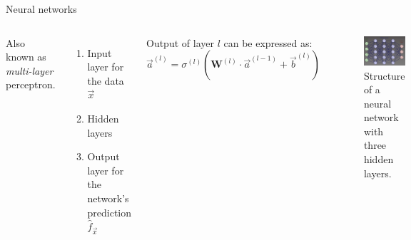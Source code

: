 \begin{frame}{Neural networks}
    \begin{columns}
        \column{\moit} Also known as \emph{multi-layer} perceptron. 
                    \begin{enumerate}
                        \item Input layer for the data $\Vec{x}$
                        \item Hidden layers
                        \item Output layer for the network's prediction $\hat{f}_{\Vec{x}}$
                    \end{enumerate}{}
                     Output of layer $l$ can be expressed as:
                        \begin{equation*}
                            \label{eq:output-any-layer}
                            \Vec{a}^{(l)} = \sigma^{(l)}\left(\mathbf{W}^{(l)} \cdot \Vec{a}^{(l-1)} + \Vec{b}^{(l)}\right)
                        \end{equation*}
        \column{\moit} \begin{figure}[ht]
                            \centering
                            \includegraphics[width=\textwidth]{imgs/Architecture-perceptron-multi-couches-2.png}
                            \caption{Structure of a neural network with three hidden layers.}
                            \label{fig:mlp}
                        \end{figure}
                       
    \end{columns}
\end{frame}

